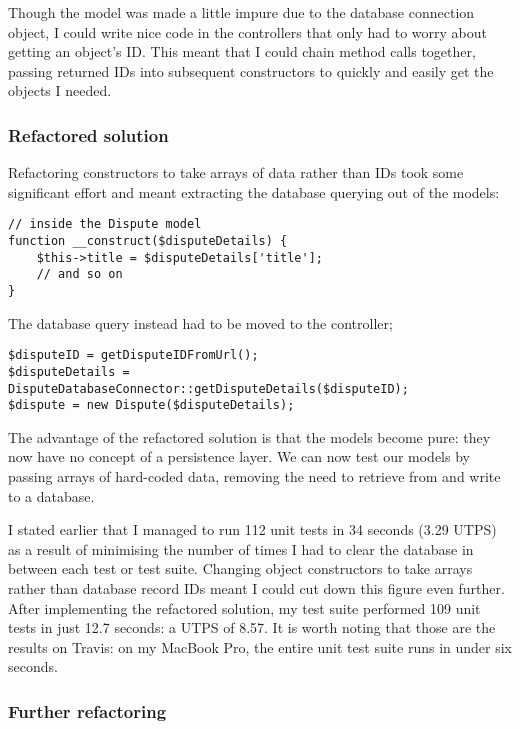 Though the model was made a little impure due to the database connection object, I could write nice code in the controllers that only had to worry about getting an object's ID. This meant that I could chain method calls together, passing returned IDs into subsequent constructors to quickly and easily get the objects I needed.

\subsubsection{Refactored solution}

Refactoring constructors to take arrays of data rather than IDs took some significant effort and meant extracting the database querying out of the models:

\begin{lstlisting}
// inside the Dispute model
function __construct($disputeDetails) {
    $this->title = $disputeDetails['title'];
    // and so on
}
\end{lstlisting}

The database query instead had to be moved to the controller;

\begin{lstlisting}
$disputeID = getDisputeIDFromUrl();
$disputeDetails = DisputeDatabaseConnector::getDisputeDetails($disputeID);
$dispute = new Dispute($disputeDetails);
\end{lstlisting}

The advantage of the refactored solution is that the models become pure: they now have no concept of a persistence layer. We can now test our models by passing arrays of hard-coded data, removing the need to retrieve from and write to a database.

I stated earlier that I managed to run 112 unit tests in 34 seconds (3.29 UTPS) as a result of minimising the number of times I had to clear the database in between each test or test suite. Changing object constructors to take arrays rather than database record IDs meant I could cut down this figure even further. After implementing the refactored solution, my test suite performed 109 unit tests in just 12.7 seconds: a UTPS of 8.57. It is worth noting that those are the results on Travis: on my MacBook Pro, the entire unit test suite runs in under six seconds. %

\subsubsection{Further refactoring}

